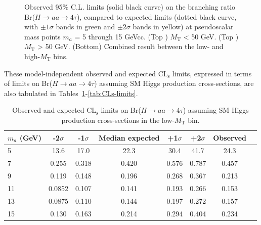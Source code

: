 \begin{figure}[hbtp]
\begin{center}
    \caption{Observed 95\% C.L. limits (solid black curve) on the branching ratio Br($H\rightarrow$$aa\rightarrow4\tau$), compared to expected limits (dotted black curve, with $\pm1\sigma$ bands in green and $\pm2\sigma$ bands in yellow) at pseudoscalar mass points $m_{a}$ = 5 through 15 GeVcc.  (Top \cmsLeft) $M_{\text{T}}$ \textless\xspace 50 GeV. (Top \cmsRight) $M_{\text{T}}$ \textgreater\xspace 50 GeV.  (Bottom) Combined result between the low- and high-$M_{\text{T}}$ bins.}
    \label{fig:lowhighMTCLs}
  \end{center}
\end{figure}

These model-independent observed and expected $\text{CL}_{\text{s}}$ limits, expressed in terms of limits on Br($H\rightarrow$$aa\rightarrow4\tau$) assuming SM Higgs production cross-sections, are also tabulated in Tables~\ref{tab:CLs-limits-lowMT}-\ref{tab:CLs-limits}.

\begin{table}
\begin{center}
  \caption{Observed and expected $\text{CL}_{\text{s}}$ limits on Br($H\rightarrow$$aa\rightarrow4\tau$) assuming SM Higgs production cross-sections in the low-$M_{\text{T}}$ bin.}
\singlespacing
\begin{tabular}{|m{3cm}|c|c|c|c|c|c|c|}
  \hline
  $m_{a}$ (GeV) & -2$\sigma$ & -1$\sigma$ & Median expected & +1$\sigma$ & +2$\sigma$ & Observed \\
  \hline
  \hline
  5 & 13.6 & 17.0 & 22.3 & 30.4 & 41.7 & 24.3 \\
  \hline
  7 & 0.255 & 0.318 & 0.420 & 0.576 & 0.787 & 0.457 \\
  \hline
  9 & 0.119 & 0.148 & 0.196 & 0.268 & 0.367 & 0.213 \\
  \hline
  11 & 0.0852 & 0.107 & 0.141 & 0.193 & 0.266 & 0.153 \\
  \hline
  13 & 0.0875 & 0.110 & 0.144 & 0.197 & 0.272 & 0.157 \\
  \hline
  15 & 0.130 & 0.163 & 0.214 & 0.294 & 0.404 & 0.234 \\
  \hline
  \end{tabular}%
\label{tab:CLs-limits-lowMT}
\end{center}
\end{table}

